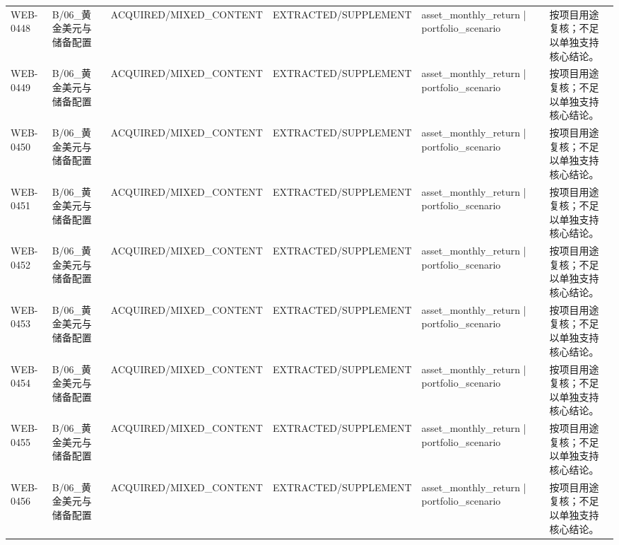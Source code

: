 \begin{landscape}
\begin{longtable}{p{1.8cm}p{2.6cm}p{2.6cm}p{2.6cm}p{4.8cm}p{7.2cm}}
WEB-0448 & B/\allowbreak{}06\_\allowbreak{}黄金美元与储备配置 & ACQUIRED/\allowbreak{}MIXED\_\allowbreak{}CONTENT & EXTRACTED/\allowbreak{}SUPPLEMENT & asset\_\allowbreak{}monthly\_\allowbreak{}return | portfolio\_\allowbreak{}scenario & 按项目用途复核；不足以单独支持核心结论。\\
WEB-0449 & B/\allowbreak{}06\_\allowbreak{}黄金美元与储备配置 & ACQUIRED/\allowbreak{}MIXED\_\allowbreak{}CONTENT & EXTRACTED/\allowbreak{}SUPPLEMENT & asset\_\allowbreak{}monthly\_\allowbreak{}return | portfolio\_\allowbreak{}scenario & 按项目用途复核；不足以单独支持核心结论。\\
WEB-0450 & B/\allowbreak{}06\_\allowbreak{}黄金美元与储备配置 & ACQUIRED/\allowbreak{}MIXED\_\allowbreak{}CONTENT & EXTRACTED/\allowbreak{}SUPPLEMENT & asset\_\allowbreak{}monthly\_\allowbreak{}return | portfolio\_\allowbreak{}scenario & 按项目用途复核；不足以单独支持核心结论。\\
WEB-0451 & B/\allowbreak{}06\_\allowbreak{}黄金美元与储备配置 & ACQUIRED/\allowbreak{}MIXED\_\allowbreak{}CONTENT & EXTRACTED/\allowbreak{}SUPPLEMENT & asset\_\allowbreak{}monthly\_\allowbreak{}return | portfolio\_\allowbreak{}scenario & 按项目用途复核；不足以单独支持核心结论。\\
WEB-0452 & B/\allowbreak{}06\_\allowbreak{}黄金美元与储备配置 & ACQUIRED/\allowbreak{}MIXED\_\allowbreak{}CONTENT & EXTRACTED/\allowbreak{}SUPPLEMENT & asset\_\allowbreak{}monthly\_\allowbreak{}return | portfolio\_\allowbreak{}scenario & 按项目用途复核；不足以单独支持核心结论。\\
WEB-0453 & B/\allowbreak{}06\_\allowbreak{}黄金美元与储备配置 & ACQUIRED/\allowbreak{}MIXED\_\allowbreak{}CONTENT & EXTRACTED/\allowbreak{}SUPPLEMENT & asset\_\allowbreak{}monthly\_\allowbreak{}return | portfolio\_\allowbreak{}scenario & 按项目用途复核；不足以单独支持核心结论。\\
WEB-0454 & B/\allowbreak{}06\_\allowbreak{}黄金美元与储备配置 & ACQUIRED/\allowbreak{}MIXED\_\allowbreak{}CONTENT & EXTRACTED/\allowbreak{}SUPPLEMENT & asset\_\allowbreak{}monthly\_\allowbreak{}return | portfolio\_\allowbreak{}scenario & 按项目用途复核；不足以单独支持核心结论。\\
WEB-0455 & B/\allowbreak{}06\_\allowbreak{}黄金美元与储备配置 & ACQUIRED/\allowbreak{}MIXED\_\allowbreak{}CONTENT & EXTRACTED/\allowbreak{}SUPPLEMENT & asset\_\allowbreak{}monthly\_\allowbreak{}return | portfolio\_\allowbreak{}scenario & 按项目用途复核；不足以单独支持核心结论。\\
WEB-0456 & B/\allowbreak{}06\_\allowbreak{}黄金美元与储备配置 & ACQUIRED/\allowbreak{}MIXED\_\allowbreak{}CONTENT & EXTRACTED/\allowbreak{}SUPPLEMENT & asset\_\allowbreak{}monthly\_\allowbreak{}return | portfolio\_\allowbreak{}scenario & 按项目用途复核；不足以单独支持核心结论。\\

\end{longtable}
\end{landscape}
